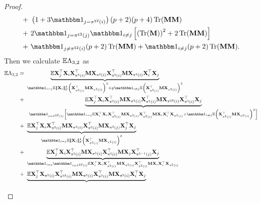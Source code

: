 \documentclass[11pt]{article}
\begin{document}
\begin{proof}
\begin{align}
+~& \bracket{1 + 3\Ind_{j = \pi^{\natural 2}(i)}}
(p+2)(p+4)\trace(\bM\bM) \notag \\
+~&
2\Ind_{j = \pi^{\natural 2}(j)} \Ind_{i \neq j}
\Bracket{\bracket{\trace(\bM)}^2 + 2\trace(\bM\bM)} \notag \\
+~&
\Ind_{j \neq \pi^{\natural 2}(i)} (p+2)\trace(\bM\bM)
+ \Ind_{i\neq j}(p+2)\trace(\bM\bM).
\end{align}
Then we calculate $\mathbb{E} \Lambda_{3, 2}$ as
\begin{align}
\label{eq:xione_square_lambda32_dd_expc}
\Expc \Lambda_{3, 2} =~& %
\underbrace{\Expc
\bX_j^{\rmt} %
\bX_{i}\bX_{\pi^{\natural}(i)}^{\rmt}
\bM
\bX_{\pi^{\natural}(i)} \bX_{\pi^{\natural}(i)}^{\rmt}
\bM
\bX_{\pi^{\natural}(i)}\bX_{i}^{\rmt}
\bX_j}_{
\Ind_{i = j}\Expc\Fnorm{\bX_i}^4 \bracket{\bX_{\pi^{\natural}(i)}^{\rmt}\bM \bX_{\pi^{\natural}(i)}}^2
+ p\Ind_{i\neq j} \Expc \bracket{\bX_{\pi^{\natural}(i)}^{\rmt}\bM \bX_{\pi^{\natural}(i)}}^2
} \notag \\
+~& \
\underbrace{\Expc
\bX_j^{\rmt}
\bX_{i}\bX_{\pi^{\natural}(i)}^{\rmt}
\bM
\bX_{\pi^{\natural}(i)} \bX_{\pi^{\natural}(i)}^{\rmt}
\bM
\bX_{\pi^{\natural 2}(i)}\bX_{\pi^{\natural}(i)}^{\rmt}
\bX_j}_{
\Ind_{i = \pi^{\natural 2}(i)}
\Bracket{
\Ind_{i = j} \Expc \bX_i^{\rmt}\bX_i \bX_{\pi^{\natural}(i)}^{\rmt}\bM \bX_{\pi^{\natural}(i)} \bX_{\pi^{\natural}(i)}^{\rmt}\bM \bX_i \bX_i^{\rmt}\bX_{\pi^{\natural}(i)}
+ \Ind_{i\neq j}\Expc\bracket{\bX_{\pi^{\natural}(i)}^{\rmt}\bM \bX_{\pi^{\natural}(i)}}^2
}
} \notag \\
+~&
\underbrace{\Expc
\bX_j^{\rmt}
\bX_{i}\bX_{\pi^{\natural}(i)}^{\rmt}
\bM
\bX_{\pi^{\natural}(i)} \bX_{\pi^{\natural}(i)}^{\rmt}
\bM
\bX_{\pi^{\natural}(j)}\bX_{j}^{\rmt}
\bX_j}_{
\Ind_{i = j}
\Expc \Fnorm{\bX_i}^4
\bracket{\bX_{\pi^{\natural}(i)}^{\rmt}\bM \bX_{\pi^{\natural}(i)}}^2
} \notag \\
+~&
\underbrace{\Expc
\bX_j^{\rmt}
\bX_{i}\bX_{\pi^{\natural}(i)}^{\rmt}
\bM
\bX_{\pi^{\natural}(i)} \bX_{\pi^{\natural}(i)}^{\rmt}
\bM
\bX_{j}\bX_{\pi^{\natural -1}(j)}^{\rmt}
\bX_j}_{
\Ind_{i = j }\Ind_{i = \pi^{\natural 2}(i)}
\Expc \bX_i^{\rmt}\bX_i \bX_{\pi^{\natural}(i)}^{\rmt}\bM \bX_{\pi^{\natural}(i)} \bX_{\pi^{\natural}(i)}^{\rmt}\bM \bX_i \bX_i^{\rmt}\bX_{\pi^{\natural}(i)}
} \notag \\
+~&
\underbrace{\Expc
\bX_j^{\rmt} %
\bX_{\pi^{\natural}(i)}\bX_{\pi^{\natural 2}(i)}^{\rmt}
\bM
\bX_{\pi^{\natural}(i)} \bX_{\pi^{\natural}(i)}^{\rmt}
\bM
\bX_{\pi^{\natural}(i)}\bX_{i}^{\rmt}
\bX_j}_{
}
\end{align}
\end{proof}
\end{document}
